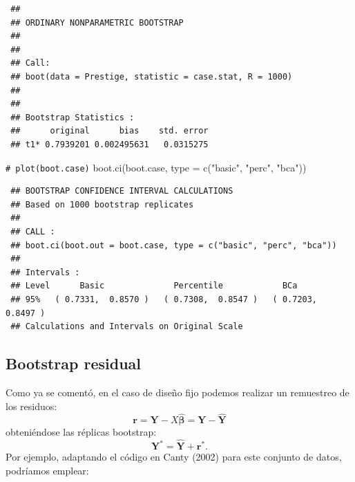 \documentclass[
]{book}
\newenvironment{Shaded}{\begin{snugshade}}{\end{snugshade}}
\newcommand{\AttributeTok}[1]{\textcolor[rgb]{0.77,0.63,0.00}{#1}}
\newcommand{\CommentTok}[1]{\textcolor[rgb]{0.56,0.35,0.01}{\textit{#1}}}
\newcommand{\FunctionTok}[1]{\textcolor[rgb]{0.00,0.00,0.00}{#1}}
\newcommand{\NormalTok}[1]{#1}
\newcommand{\StringTok}[1]{\textcolor[rgb]{0.31,0.60,0.02}{#1}}
\theoremstyle{break}
\theoremstyle{nonumberplain}
\renewcommand{\CommentTok}[1]{\textcolor[rgb]{0.41,0.41,0.41}{\texttt{#1}}}
\begin{document}
\begin{verbatim}
 ## 
 ## ORDINARY NONPARAMETRIC BOOTSTRAP
 ## 
 ## 
 ## Call:
 ## boot(data = Prestige, statistic = case.stat, R = 1000)
 ## 
 ## 
 ## Bootstrap Statistics :
 ##      original      bias    std. error
 ## t1* 0.7939201 0.002495631   0.0315275
\end{verbatim}

\begin{Shaded}
\begin{Highlighting}[]
\CommentTok{\# plot(boot.case)}
\FunctionTok{boot.ci}\NormalTok{(boot.case, }\AttributeTok{type =} \FunctionTok{c}\NormalTok{(}\StringTok{"basic"}\NormalTok{, }\StringTok{"perc"}\NormalTok{, }\StringTok{"bca"}\NormalTok{))}
\end{Highlighting}
\end{Shaded}

\begin{verbatim}
 ## BOOTSTRAP CONFIDENCE INTERVAL CALCULATIONS
 ## Based on 1000 bootstrap replicates
 ## 
 ## CALL : 
 ## boot.ci(boot.out = boot.case, type = c("basic", "perc", "bca"))
 ## 
 ## Intervals : 
 ## Level      Basic              Percentile            BCa          
 ## 95%   ( 0.7331,  0.8570 )   ( 0.7308,  0.8547 )   ( 0.7203,  0.8497 )  
 ## Calculations and Intervals on Original Scale
\end{verbatim}

\hypertarget{boot-residual}{%
\subsection{Bootstrap residual}\label{boot-residual}}

Como ya se comentó, en el caso de diseño fijo podemos realizar un remuestreo de los residuos:
\[\mathbf{r} = \mathbf{Y} - X\hat{\mathbf{\beta}} = \mathbf{Y} - \hat{\mathbf{Y}}\]
obteniéndose las réplicas bootstrap:
\[\mathbf{Y}^{\ast} = \hat{\mathbf{Y}} + \mathbf{r}^{\ast}.\]
Por ejemplo, adaptando el código en Canty (2002) para este conjunto de datos, podríamos emplear:
\end{document}
